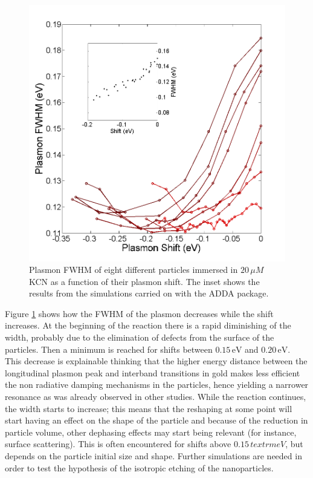 \documentclass{article}
\begin{document}
\begin{figure}[p]
 \centering
 \includegraphics[width=0.95\linewidth]{fwhm_several_in_eV.png}
 \caption{Plasmon FWHM of eight different particles immersed in $20\,\mu M$ KCN
 as a function of their plasmon shift. The inset shows the results from the
 simulations carried on with the ADDA package.}
 \label{fig:FWHM}
\end{figure}

Figure \ref{fig:FWHM} shows how the FWHM of the plasmon decreases while the
shift increases. At the beginning of the reaction there is a rapid diminishing
of the width, probably due to the elimination of defects from the surface of the
particles. Then a minimum is reached for shifts between $0.15\,\textrm{eV}$ and
$0.20\,\textrm{eV}$. This decrease is explainable thinking that the higher
energy distance between the longitudinal plasmon peak and interband transitions
in gold makes less efficient the non radiative damping mechanisms in the
particles, hence yielding a narrower resonance as was already observed in other
studies\cite{Sonnichsen2002}. While the reaction continues, the width starts to
increase; this means that the reshaping at some point will start having an
effect on the shape of the particle and because of the reduction in particle
volume, other dephasing effects may start being relevant (for instance, surface
scattering). This is often encountered for shifts above $0.15\,textrm{eV}$, but
depends on the particle initial size and shape. Further simulations are needed
in order to test the hypothesis of the isotropic etching of the nanoparticles.
\end{document}

